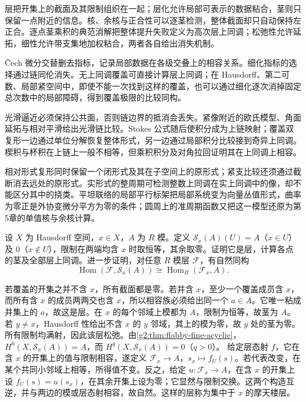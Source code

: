 \begin{chaptersummary}
	层把开集上的截面及其限制组织在一起；层化允许局部可表示的数据粘合，茎则只保留一点附近的信息。核、余核与正合性可以逐茎检测，整体截面却只自动保持左正合。逐点茎乘积的典范消解把整体提升失败定义为高次层上同调；松弛性允许延拓，细性允许带支集地加权粘合，两者各自给出消失机制。

	\ProseParagraphBreak

	Čech 微分交替删去指标，记录局部数据在各级交叠上的相容关系。细化指标的选择通过链同伦消失。无上同调覆盖可直接计算层上同调；在 Hausdorff、第二可数、局部紧空间中，即使不能一次找到这样的覆盖，也可以通过细化逐次消掉固定总次数中的局部障碍，得到覆盖极限的比较同构。

	\ProseParagraphBreak

	光滑逼近必须保持公共面，否则链边界的抵消会丢失。紧像附近的欧氏模型、角面延拓与相对平滑给出光滑链比较。Stokes 公式随后使积分成为上链映射；覆盖双复形一边通过单位分解恢复整体形式，另一边通过局部积分比较接到奇异上同调。楔积与杯积在上链上一般不相等，但乘积积分及对角拉回证明其在上同调上相容。

	\ProseParagraphBreak

	相对形式复形同时保留一个闭形式及其在子空间上的原形式；紧支比较还须通过截断消去远处的原形式。实形式的整周期可检测整数上同调在实上同调中的像，却不能区分其中的挠类。平坦联络的局部平行标架把局部系统变为向量丛值形式，曲率为零正是外协变微分平方为零的条件；圆周上的准周期函数又把这一模型还原为第5章的单值核与余核计算。
\end{chaptersummary}

\BookExercises

\begin{exercise}\label{g2:ex:skyscraper-sheaf}
	设 \(X\) 为 Hausdorff 空间，\(x\in X\)，\(A\) 为 \(R\) 模。定义 \(\mathcal S_x(A)(U)=A\)（\(x\in U\)）及 \(0\)（\(x\notin U\)），限制在两端均含 \(x\) 时取恒等，其余取零。证明它是层，计算各点的茎及全部层上同调。进一步证明，对任意 \(R\) 模层 \(\mathcal F\)，有自然同构
	\[
		\operatorname{Hom}(\mathcal F,\mathcal S_x(A))\cong\operatorname{Hom}_R(\mathcal F_x,A).
	\]
\end{exercise}
\begin{solution}
	若覆盖的开集之并不含 \(x\)，所有截面都是零。若并含 \(x\)，至少一个覆盖成员含 \(x\)，而所有含 \(x\) 的成员两两交也含 \(x\)，所以相容族必须给出同一个 \(a\in A\)。它唯一粘成并集上的 \(a\)，故这是层。在 \(x\) 的每个邻域上模都为 \(A\)，限制为恒等，故茎为 \(A\)。若 \(y\ne x\)，Hausdorff 性给出不含 \(x\) 的 \(y\) 邻域，其上的模为零，故 \(y\) 处的茎为零。
	所有限制均满射，因此该层松弛。由\cref{g2:thm:flabby-fine-acyclic}，\(H^0(X,\mathcal S_x(A))=A\)，而 \(H^q(X,\mathcal S_x(A))=0\)（\(q>0\)）。
	给定层态射 \(f\)，它在含 \(x\) 的开集上的值与限制相容，遂定义 \(\mathcal F_x\to A\)，\(s_x\mapsto f_U(s)\)。若代表改变，在某个共同小邻域上相等，所得值不变。反之，给定 \(u:\mathcal F_x\to A\)，在含 \(x\) 的开集上设 \(f_U(s)=u(s_x)\)，在其余开集上设为零；它显然与限制交换。这两个构造互逆，并与两边的模或层态射相容，故自然。这样的层称为集中于 \(x\) 的摩天楼层。
\end{solution}

